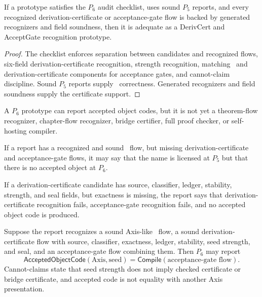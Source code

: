 \begin{theorem}
\label{thm:deriv-accept-p6-adequacy}
If a prototype satisfies the $P_6$ audit checklist, uses sound $P_5$ reports, and every recognized derivation-certificate or acceptance-gate flow is backed by generated recognizers and field soundness, then it is adequate as a DerivCert and AcceptGate recognition prototype.
\end{theorem}

\begin{proof}
The checklist enforces separation between candidates and recognized flows, six-field derivation-certificate recognition, strength recognition, matching \NameCert\ and derivation-certificate components for acceptance gates, and cannot-claim discipline. Sound $P_5$ reports supply \NameCert\ correctness. Generated recognizers and field soundness supply the certificate support.
\end{proof}

\begin{corollary}
\label{cor:deriv-accept-p6-not-higher}
A $P_6$ prototype can report accepted object codes, but it is not yet a theorem-flow recognizer, chapter-flow recognizer, bridge certifier, full proof checker, or self-hosting compiler.
\end{corollary}

\begin{example}
\label{ex:deriv-accept-namecert-without-derivcert}
If a report has a recognized and sound \NameCert\ flow, but missing derivation-certificate and acceptance-gate flows, it may say that the name is licensed at $P_5$ but that there is no accepted object at $P_6$.
\end{example}

\begin{example}
\label{ex:deriv-accept-derivcert-missing-exactness}
If a derivation-certificate candidate has source, classifier, ledger, stability, strength, and seal fields, but exactness is missing, the report says that derivation-certificate recognition fails, acceptance-gate recognition fails, and no accepted object code is produced.
\end{example}

\begin{example}
\label{ex:deriv-accept-axis-seed}
Suppose the report recognizes a sound Axis-like \NameCert\ flow, a sound derivation-certificate flow with source, classifier, exactness, ledger, stability, seed strength, and seal, and an acceptance-gate flow combining them. Then $P_6$ may report
$$
  \mathsf{AcceptedObjectCode}(\mathrm{Axis},\mathrm{seed})
  =
  \mathsf{Compile}(\text{acceptance-gate flow}).
$$
Cannot-claims state that seed strength does not imply checked certificate or bridge certificate, and accepted code is not equality with another Axis presentation.
\end{example}

